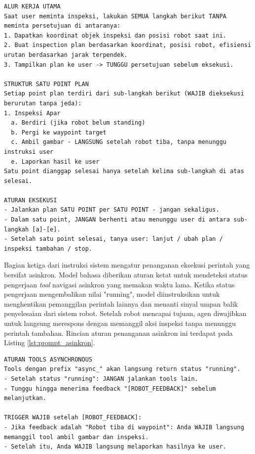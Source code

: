 \begin{lstlisting}[caption={Instruksi Alur Kerja Utama Inspeksi}, label={lst:prompt_alur}]
ALUR KERJA UTAMA
Saat user meminta inspeksi, lakukan SEMUA langkah berikut TANPA meminta persetujuan di antaranya:
1. Dapatkan koordinat objek inspeksi dan posisi robot saat ini.
2. Buat inspection plan berdasarkan koordinat, posisi robot, efisiensi urutan berdasarkan jarak terpendek.
3. Tampilkan plan ke user -> TUNGGU persetujuan sebelum eksekusi.

STRUKTUR SATU POINT PLAN
Setiap point plan terdiri dari sub-langkah berikut (WAJIB dieksekusi berurutan tanpa jeda):
1. Inspeksi Apar
  a. Berdiri (jika robot belum standing)
  b. Pergi ke waypoint target
  c. Ambil gambar - LANGSUNG setelah robot tiba, tanpa menunggu instruksi user
  e. Laporkan hasil ke user
Satu point dianggap selesai hanya setelah kelima sub-langkah di atas selesai.

ATURAN EKSEKUSI
- Jalankan plan SATU POINT per SATU POINT - jangan sekaligus.
- Dalam satu point, JANGAN berhenti atau menunggu user di antara sub-langkah [a]-[e].
- Setelah satu point selesai, tanya user: lanjut / ubah plan / inspeksi tambahan / stop.
\end{lstlisting}

Bagian ketiga dari instruksi sistem mengatur penanganan eksekusi perintah yang bersifat asinkron. Model bahasa diberikan aturan ketat untuk mendeteksi status pengerjaan \textit{tool} navigasi asinkron yang memakan waktu lama. Ketika status pengerjaan mengembalikan nilai "running", model diinstruksikan untuk menghentikan pemanggilan perintah lainnya dan menanti sinyal umpan balik penyelesaian dari sistem robot. Setelah robot mencapai tujuan, agen diwajibkan untuk langsung merespons dengan memanggil aksi inspeksi tanpa menunggu perintah tambahan. Rincian aturan penanganan asinkron ini terdapat pada Listing \ref{lst:prompt_asinkron}.

\begin{lstlisting}[caption={Instruksi Penanganan \textit{Tool} Asinkron}, label={lst:prompt_asinkron}]
ATURAN TOOLS ASYNCHRONOUS
Tools dengan prefix "async_" akan langsung return status "running".
- Setelah status "running": JANGAN jalankan tools lain.
- Tunggu hingga menerima feedback "[ROBOT_FEEDBACK]" sebelum melanjutkan.

TRIGGER WAJIB setelah [ROBOT_FEEDBACK]:
- Jika feedback adalah "Robot tiba di waypoint": Anda WAJIB langsung memanggil tool ambil gambar dan inspeksi.
- Setelah itu, Anda WAJIB langsung melaporkan hasilnya ke user.
\end{lstlisting}

